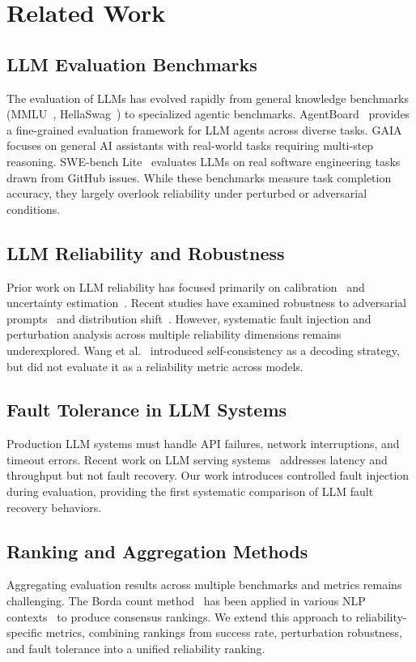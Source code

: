 \section{Related Work}

\subsection{LLM Evaluation Benchmarks}

The evaluation of LLMs has evolved rapidly from general knowledge benchmarks (MMLU~\cite{hendrycks2021measuring}, HellaSwag~\cite{zellers2019hellaswag}) to specialized agentic benchmarks. AgentBoard~\cite{ma2024agentboard} provides a fine-grained evaluation framework for LLM agents across diverse tasks. GAIA~\cite{mialon2023gaia} focuses on general AI assistants with real-world tasks requiring multi-step reasoning. SWE-bench Lite~\cite{jimenez2024swebench} evaluates LLMs on real software engineering tasks drawn from GitHub issues. While these benchmarks measure task completion accuracy, they largely overlook reliability under perturbed or adversarial conditions.

\subsection{LLM Reliability and Robustness}

Prior work on LLM reliability has focused primarily on calibration~\cite{guo2017calibration} and uncertainty estimation~\cite{kadavath2022language}. Recent studies have examined robustness to adversarial prompts~\cite{zou2023universal} and distribution shift~\cite{hendrycks2021measuring}. However, systematic fault injection and perturbation analysis across multiple reliability dimensions remains underexplored. Wang et al.~\cite{wang2023selfconsistency} introduced self-consistency as a decoding strategy, but did not evaluate it as a reliability metric across models.

\subsection{Fault Tolerance in LLM Systems}

Production LLM systems must handle API failures, network interruptions, and timeout errors. Recent work on LLM serving systems~\cite{kwon2023efficient} addresses latency and throughput but not fault recovery. Our work introduces controlled fault injection during evaluation, providing the first systematic comparison of LLM fault recovery behaviors.

\subsection{Ranking and Aggregation Methods}

Aggregating evaluation results across multiple benchmarks and metrics remains challenging. The Borda count method~\cite{borda1781memoire} has been applied in various NLP contexts~\cite{chowdhury2023borda} to produce consensus rankings. We extend this approach to reliability-specific metrics, combining rankings from success rate, perturbation robustness, and fault tolerance into a unified reliability ranking.
